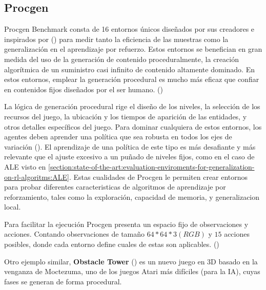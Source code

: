 \subsection{Procgen}

Procgen Benchmark consta de 16 entornos únicos diseñados por sus creadores e inspirados por (\cite{bellemare2013arcade}) para medir tanto la eficiencia de las muestras como la generalización en el aprendizaje por refuerzo. Estos entornos se benefician en gran medida del uso de la generación de contenido proceduralmente, la creación algorítmica de un suministro casi infinito de contenido altamente dominado. En estos entornos, emplear la generación procedural es mucho más eficaz que confiar en contenidos fijos diseñados por el ser humano. (\cite{cobbe2020leveraging})

La lógica de generación procedural rige el diseño de los niveles, la selección de los recursos del juego, la ubicación y los tiempos de aparición de las entidades, y otros detalles específicos del juego. Para dominar cualquiera de estos entornos, los agentes deben aprender una política que sea robusta en todos los ejes de variación (\cite{cobbe2020leveraging}). El aprendizaje de una política de este tipo es más desafiante y más relevante que el ajuste excesivo a un puñado de niveles fijos, como en el caso de ALE visto en \ref{section:state-of-the-art:evaluation-enviroments-for-generalization-on-rl-algoritms:ALE}. Estas cualidades de Procgen le permiten crear entornos para probar diferentes caracteristicas de algoritmos de aprendizaje por reforzamiento, tales como la exploración, capacidad de memoria, y generalizacion local.

Para facilitar la ejecución Procgen presenta un espacio fijo de observaciones y acciones. Contando observaciones de tamaño $64*64*3(RGB)$ y $15$ acciones posibles, donde cada entorno define cuales de estas son aplicables. (\cite{cobbe2020leveraging})

Otro ejemplo similar, \textbf{Obstacle Tower} (\cite{juliani2019obstacle}) es un nuevo juego en 3D basado en la venganza de Moctezuma, uno de los juegos Atari más difíciles (para la IA), cuyas fases se generan de forma procedural. 

